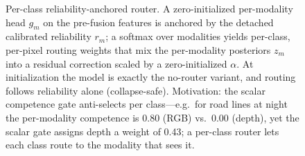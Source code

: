 \documentclass[letterpaper, 10pt, conference]{ieeeconf}
\begin{document}


\begin{figure}[t]
  \centering
  \resizebox{0.98\linewidth}{!}{}
  \caption{Per-class reliability-anchored router. A zero-initialized
  per-modality head $g_m$ on the pre-fusion features is anchored by the
  detached calibrated reliability $r_m$; a softmax over modalities yields
  per-class, per-pixel routing weights that mix the per-modality
  posteriors $z_m$ into a residual correction scaled by a
  zero-initialized $\alpha$. At initialization the model is exactly the
  no-router variant, and routing follows reliability alone
  (collapse-safe). Motivation: the scalar competence gate anti-selects per
  class---e.g.\ for road lines at night the per-modality competence is
  0.80 (RGB) vs.\ 0.00 (depth), yet the scalar gate assigns depth a weight
  of 0.43; a per-class router lets each class route to the modality that
  sees it.}
  \label{fig:router}
\end{figure}



\begin{figure}[t]
  
\end{figure}

\begin{figure}[t]
  
\end{figure}






\end{document}
